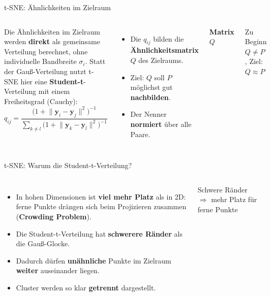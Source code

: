 \begin{frame}{t-SNE: Ähnlichkeiten im Zielraum}
\footnotesize
\begin{columns}

Die Ähnlichkeiten im Zielraum werden \textbf{direkt} als gemeinsame
Verteilung berechnet, ohne individuelle Bandbreite $\sigma_i$. Statt der
Gauß-Verteilung nutzt t-SNE hier eine \textbf{Student-t}-Verteilung mit
einem Freiheitsgrad (Cauchy):
\[
  q_{ij} =
  \frac{\bigl(1 + \lVert \mathbf{y}_i - \mathbf{y}_j \rVert^2\bigr)^{-1}}
       {\sum_{k \neq l} \bigl(1 + \lVert \mathbf{y}_k - \mathbf{y}_l \rVert^2\bigr)^{-1}}
\]

\begin{itemize}
  \item Die $q_{ij}$ bilden die \textbf{Ähnlichkeitsmatrix} $Q$ des
        Zielraums.
  \item Ziel: $Q$ soll $P$ möglichst gut \textbf{nachbilden}.
  \item Der Nenner \textbf{normiert} über alle Paare.
\end{itemize}

\centering
\textbf{Matrix $Q$}\\[3pt]

{\scriptsize Zu Beginn $Q \neq P$, Ziel: $Q \approx P$}
\end{columns}
\end{frame}

\begin{frame}{t-SNE: Warum die Student-t-Verteilung?}
\footnotesize
\begin{columns}
\begin{itemize}
  \item In hohen Dimensionen ist \textbf{viel mehr Platz} als in 2D: ferne
        Punkte drängen sich beim Projizieren zusammen (\textbf{Crowding
        Problem}).
  \item Die Student-t-Verteilung hat \textbf{schwerere Ränder} als die
        Gauß-Glocke.
  \item Dadurch dürfen \textbf{unähnliche} Punkte im Zielraum \textbf{weiter}
        auseinander liegen.
  \item Cluster werden so klar \textbf{getrennt} dargestellt.
\end{itemize}

\centering


{\scriptsize Schwere Ränder $\Rightarrow$ mehr Platz für ferne Punkte}
\end{columns}
\end{frame}

